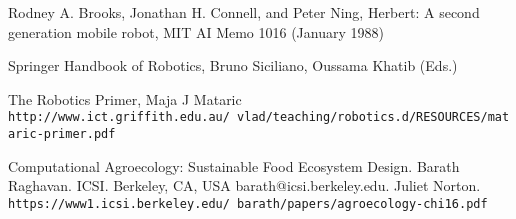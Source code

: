 \documentclass[format=acmsmall, review=false, screen=true]{acmart}
\begin{document}
\begin{thebibliography}{9}
Rodney A. Brooks, Jonathan H. Connell, and Peter Ning, Herbert: A second generation mobile robot, MIT AI Memo 1016 (January 1988)

Springer Handbook of Robotics, Bruno Siciliano, Oussama Khatib (Eds.)

The Robotics Primer, Maja J Mataric
\\\texttt{http://www.ict.griffith.edu.au/~vlad/teaching/robotics.d/RESOURCES/mataric-primer.pdf}

Computational Agroecology: Sustainable Food Ecosystem Design. Barath Raghavan. ICSI. Berkeley, CA, USA barath@icsi.berkeley.edu. Juliet Norton.\\\texttt{https://www1.icsi.berkeley.edu/~barath/papers/agroecology-chi16.pdf}

\end{thebibliography}
\end{document}
